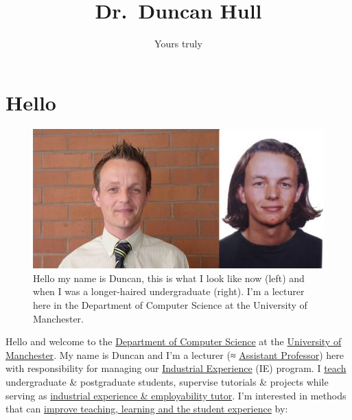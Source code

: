 \documentclass[
  12pt,
]{book}
\title{Dr.~Duncan Hull}
\author{Yours truly}
\date{}
\begin{document}
\maketitle

{
\setcounter{tocdepth}{1}
\tableofcontents
}
\hypertarget{hello}{%
\chapter*{Hello}\label{hello}}

\begin{figure}

{\centering \includegraphics[width=0.66\linewidth]{images/duncan_hull} 

}

\caption{Hello my name is Duncan, this is what I look like now (left) and when I was a longer-haired undergraduate (right). I'm a lecturer here in the Department of Computer Science at the University of Manchester.}\label{fig:unsplashed-fig}
\end{figure}

Hello and welcome to the \href{https://www.cs.manchester.ac.uk/}{Department of Computer Science} at the \href{https://www.manchester.ac.uk}{University of Manchester}. My name is Duncan and I'm a lecturer (≈ \href{https://en.wikipedia.org/wiki/Assistant_professor}{Assistant Professor}) here with responsibility for managing our \href{https://www.cs.manchester.ac.uk/study/undergraduate/industrial-experience/}{Industrial Experience} (IE) program. I \href{https://personalpages.manchester.ac.uk/staff/duncan.hull/teaching.html}{teach} undergraduate \& postgraduate students, supervise tutorials \& projects while serving as \href{http://studentnet.cs.manchester.ac.uk/employment/placement/}{industrial experience \& employability tutor}. I'm interested in methods that can \href{https://personalpages.manchester.ac.uk/staff/duncan.hull/research.html}{improve teaching, learning and the student experience} by:
\end{document}
